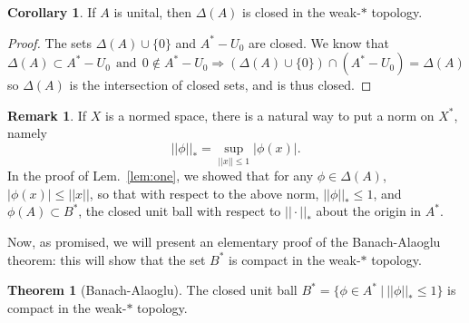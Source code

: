 \documentclass[aps,pra,showpacs,notitlepage,onecolumn,superscriptaddress,nofootinbib]{revtex4-1}
\theoremstyle{definition}
\newtheorem{theorem}{Theorem}[section]
\newtheorem{corollary}{Corollary}[theorem]
\newtheorem{remark}{Remark}[section]
\begin{document}
\begin{corollary}
  \label{cor:one}
  If $A$ is unital, then $\Delta(A)$ is closed in the weak-$*$ topology.
\end{corollary}
\begin{proof}
  The sets $\Delta(A) \cup \{0\}$ and $A^{*} - U_0$ are closed. We know that
  \begin{equation}
    \Delta(A) \subset A^{*} - U_0 \ \ \text{and} \ \ 0 \notin A^{*} - U_0 \Longrightarrow (\Delta(A) \cup \{0\}) \cap (A^{*} - U_0) = \Delta(A)
    \end{equation}
  so $\Delta(A)$ is the intersection of closed sets, and is thus closed.
  \end{proof}

\begin{remark}
If $X$ is a normed space, there is a natural way to put a norm on $X^{*}$, namely
\begin{equation}
  || \phi ||_{*} = \sup_{||x|| \leq 1} |\phi(x)|.
\end{equation}
In the proof of Lem.~\ref{lem:one}, we showed that for any $\phi \in \Delta(A)$, $|\phi(x)| \leq ||x||$, so that with respect to the above norm, $||\phi||_{*} \leq 1$, and
$\phi(A) \subset B^{*}$, the closed unit ball with respect to $||\cdot||_{*}$ about the origin in $A^{*}$.
\end{remark}

\noindent Now, as promised, we will present an elementary proof of the Banach-Alaoglu theorem: this will show that the set $B^{*}$ is compact in the
weak-$*$ topology.

\begin{theorem}[Banach-Alaoglu]
  The closed unit ball $B^{*} = \{\phi \in A^{*} \ | \ ||\phi||_{*} \leq 1\}$ is compact in the weak-$*$ topology.
\end{theorem}
\end{document}
